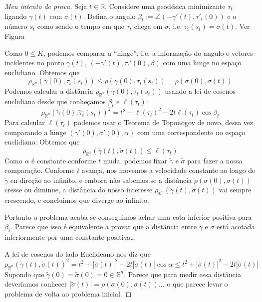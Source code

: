 \documentclass{book}
\begin{document}
\begin{proof}[Meu intento de prova]
Seja $t \in \mathbb{R}$. Considere uma
geodésica minimizante $\tau_t$ ligando
$\gamma(t)$ com $\sigma(t)$. Defina o angulo
$\beta_t:=\angle(-\gamma'(t),\tau'_t(0))$ e o
número $s_t$ como sendo o tempo em que
$\tau_t$ chega em $\sigma$, i.e.
$\tau_t(s_t)=\sigma(t)$. Ver Figura

Como $0 \leq  K$, podemos comparar a
``hinge'',
i.e. a informação do angulo e vetores
incidentes no ponto $\gamma(t)$,
$(-\gamma'(t),\tau_t'(0),\beta)$ com uma
hinge no espaço
euclidiano. Obtemos que
$$
\rho_{\mathbb{R}^n}(\tilde{\gamma}(0),
\tilde{\tau}_t(s_t))\leq
\rho(\gamma(0),\tau_t(s_t))=\rho(\sigma(0),
\sigma(t))
$$
Podemos calcular a distância
$\rho_{\mathbb{R}^n}(\tilde{\gamma}(0),
\tilde{\tau}_t(s_t))$
usando a lei de
cosenos euclidiana desde que conheçamos
$\beta_t$ e $\ell(\tau_t)$:
$$
\rho_{\mathbb{R}^n}(\tilde{\gamma}(0),
\tilde{\tau}_t(s_t))^2=
t^2+\ell(\tau_t)^2-2t\ell(\tau_t)\cos \beta_t
$$
Para calcular $\ell(\tau_t)$ podemos usar o
Teorema de Toponogov de novo, dessa
vez comparando a hinge $(\gamma'(0),
\sigma'(0),\alpha)$ com uma correspondente
no espaço euclidiano:
Obtemos que
$$
\rho_{\mathbb{R}^n}(\tilde{\gamma}(t),
\tilde{\sigma}(t))\leq
\ell(\tau_t)
$$
Como $\alpha$ é constante conforme $t$ muda,
podemos fixar $\tilde{\gamma}$ e
$\tilde{\sigma}$ para fazer a nossa
comparação. Conforme  $t$ avança, nos
movemos a velocidade constante ao longo de
$\tilde{\gamma}$ en direção ao
infinito, e embora não sabemos se a distância
$\rho(\sigma(0),\sigma(t))$ cresse
 ou diminue, a distância do nosso interesse
$\rho_{\mathbb{R}^n}(\tilde{\gamma}(t),
\tilde{\sigma}(t))$
vai sempre crescendo, e concluimos que
diverge ao infinito.

Portanto o problema acaba se conseguimos
achar uma cota inferior positiva para
$\beta_t$. Parece que isso é equivalente a
provar que a distância entre
$\gamma$ e $\sigma$ está acotada
inferiormente por uma constante positiva…

A lei de cosenos do lado Euclideano nos diz
que
$$
\rho_{\mathbb{R}^n}(\tilde{\gamma}(t),
\tilde{\sigma}(t))^2=
t^2+|\tilde{\sigma}(t)|^2-2t
|\tilde{\sigma}(t)|\cos \alpha
\leq t^2+|\tilde{\sigma}(t)|^2-2t
|\tilde{\sigma}(t)|
$$
Supondo que
$\tilde{\gamma}(0)=\tilde{\sigma}(0)=0 \in
\mathbb{R}^n$.
Parece que para medir essa distância
deveríamos conhecer
$|\tilde{\sigma}(t)|=\rho(\sigma(0),\sigma(t)
)$...
 o que parece levar o problema de volta ao
problema inicial.
\end{proof}
\end{document}
